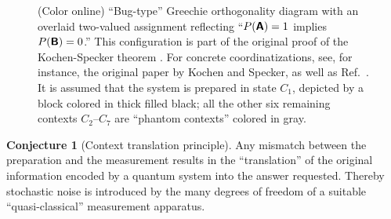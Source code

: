 \documentclass[%
  preprint,
 showpacs,
 showkeys,
 preprintnumbers,
 amsmath,amssymb,
 aps,
 prl,
  longbibliography,
 ]{revtex4-1}
\theoremstyle{definition}
\newtheorem{conjecture}{Conjecture}
\theoremstyle{remark}
\begin{document}
\begin{figure}[h]
\begin{center}
\end{center}
\caption{(Color online)
``Bug-type'' \cite{Specker-priv} Greechie orthogonality diagram
with an overlaid two-valued assignment reflecting ``$P(\textsf{\textbf{A}})=1$ implies $P(\textsf{\textbf{B}})=0$.''
This configuration is part of the original
proof of the Kochen-Specker theorem \cite[$\Gamma_1$]{kochen1}.
For concrete coordinatizations, see, for instance, the original paper by Kochen and Specker, as well as Ref.~\cite{svozil-tkadlec,2012-incomput-proofsCJ}.
It is assumed that the system is prepared in state $C_1$, depicted by a block colored in thick filled black;
all the other six remaining contexts $C_2$--$C_7$ are   ``phantom contexts'' colored in gray.
}
\label{2012-psiqm-v2-f2}
\end{figure}

\begin{conjecture}[Context translation principle]
Any mismatch between the preparation and the measurement results in the ``translation''
of the original information encoded by a quantum system into the answer requested.
Thereby stochastic noise is introduced by the many degrees of freedom of a suitable ``quasi-classical'' measurement apparatus.
\end{conjecture}
\end{document}
